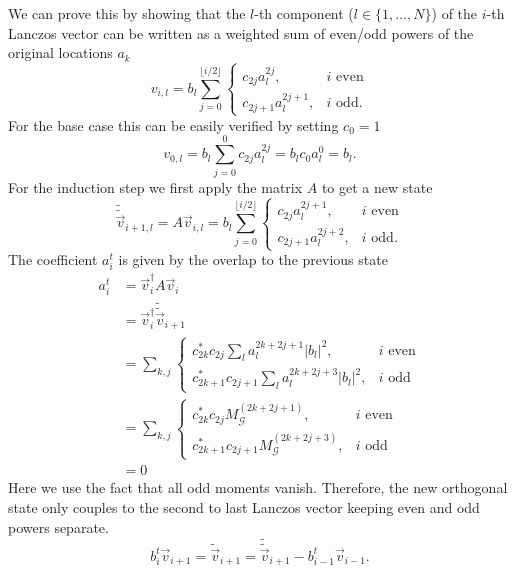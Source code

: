 We can prove this by showing that the $l$-th component ($l \in \{1, \ldots, N\}$)
of the $i$-th Lanczos vector
can be written as a weighted sum
of even/odd powers of the original locations $a_k$
\begin{equation}
    v_{i,l}
    =
    b_l\!\sum\limits_{j=0}^{\lfloor i/2\rfloor}
    \begin{cases}
        c_{2j} a_l^{2j},     & i \text{ even} \\
        c_{2j+1} a_l^{2j+1}, & i \text{ odd}.
    \end{cases}
\end{equation}
For the base case this can be easily verified by setting $c_0=1$
\begin{equation}
    v_{0,l}
    =
    b_l\!\sum\limits_{j=0}^{0} c_{2j} a_l^{2j}
    =
    b_l c_{0} a_l^0
    =
    b_l.
\end{equation}
For the induction step we first apply the matrix $A$ to get a new state
\begin{equation}
    \tilde{\tilde{\vec{v}}}_{i+1,l}
    =
    A \vec{v}_{i,l}
    =
    b_l\!\sum\limits_{j=0}^{\lfloor i/2\rfloor}
    \begin{cases}
        c_{2j} a_l^{2j+1},   & i \text{ even} \\
        c_{2j+1} a_l^{2j+2}, & i \text{ odd}.
    \end{cases}
\end{equation}
The coefficient $a_i^t$ is given by the overlap to the previous state
\begin{align}
    a_i^t
     & =
    \vec{v}_i^\dagger A \vec{v}_i                                                \\
     & =
    \vec{v}_i^\dagger \tilde{\tilde{\vec{v}}}_{i+1}                              \\
     & =
    \sum\limits_{k,j}
    \begin{cases}
        c_{2k}^* c_{2j} \sum\limits_l a_l^{2k+2j+1}|b_l|^2,     & i \text{ even} \\
        c_{2k+1}^* c_{2j+1} \sum\limits_l a_l^{2k+2j+3}|b_l|^2, & i \text{ odd}
    \end{cases}     \\
     & =
    \sum\limits_{k,j}
    \begin{cases}
        c_{2k}^* c_{2j}    M^{(2k+2j+1)}_{\mathcal{G}},  & i \text{ even} \\
        c_{2k+1}^* c_{2j+1} M^{(2k+2j+3)}_{\mathcal{G}}, & i \text{ odd}
    \end{cases} \\
     & =
    0
\end{align}
Here we use the fact that all odd moments vanish.
Therefore, the new orthogonal state only couples to the second to last Lanczos vector
keeping even and odd powers separate.
\begin{equation}
    b_i^t \vec{v}_{i+1}
    =
    \tilde{\vec{v}}_{i+1}
    =
    \tilde{\tilde{\vec{v}}}_{i+1} - b_{i-1}^t \vec{v}_{i-1}.
\end{equation}
